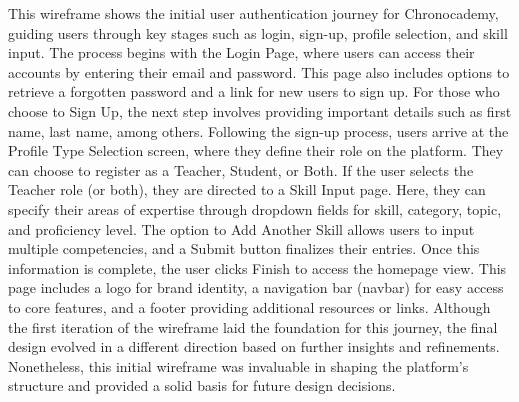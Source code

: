 This wireframe shows the initial user authentication journey for Chronocademy, guiding users through key stages such as login, sign-up, profile selection, and skill input.
The process begins with the Login Page, where users can access their accounts by entering their email and password.
This page also includes options to retrieve a forgotten password and a link for new users to sign up.
For those who choose to Sign Up, the next step involves providing important details such as first name, last name, among others.
Following the sign-up process, users arrive at the Profile Type Selection screen, where they define their role on the platform.
They can choose to register as a Teacher, Student, or Both.
If the user selects the Teacher role (or both), they are directed to a Skill Input page.
Here, they can specify their areas of expertise through dropdown fields for skill, category, topic, and proficiency level.
The option to Add Another Skill allows users to input multiple competencies, and a Submit button finalizes their entries.
Once this information is complete, the user clicks Finish to access the homepage view.
This page includes a logo for brand identity, a navigation bar (navbar) for easy access to core features, and a footer providing additional resources or links.
Although the first iteration of the wireframe laid the foundation for this journey, the final design evolved in a different direction based on further insights and refinements.
Nonetheless, this initial wireframe was invaluable in shaping the platform's structure and provided a solid basis for future design decisions.\newline\newline

